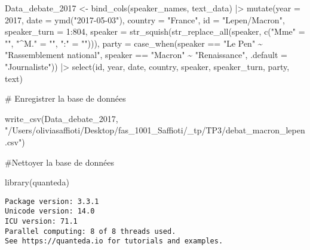 \documentclass[
  letterpaper,
  DIV=11,
  numbers=noendperiod]{scrartcl}
\newenvironment{Shaded}{\begin{snugshade}}{\end{snugshade}}
\newcommand{\AttributeTok}[1]{\textcolor[rgb]{0.40,0.45,0.13}{#1}}
\newcommand{\CommentTok}[1]{\textcolor[rgb]{0.37,0.37,0.37}{#1}}
\newcommand{\DecValTok}[1]{\textcolor[rgb]{0.68,0.00,0.00}{#1}}
\newcommand{\FunctionTok}[1]{\textcolor[rgb]{0.28,0.35,0.67}{#1}}
\newcommand{\NormalTok}[1]{\textcolor[rgb]{0.00,0.23,0.31}{#1}}
\newcommand{\OtherTok}[1]{\textcolor[rgb]{0.00,0.23,0.31}{#1}}
\newcommand{\SpecialCharTok}[1]{\textcolor[rgb]{0.37,0.37,0.37}{#1}}
\newcommand{\StringTok}[1]{\textcolor[rgb]{0.13,0.47,0.30}{#1}}
\begin{document}
\begin{Shaded}
\begin{Highlighting}[]
\NormalTok{Data\_debate\_2017 }\OtherTok{\textless{}{-}} \FunctionTok{bind\_cols}\NormalTok{(speaker\_names, text\_data) }\SpecialCharTok{|\textgreater{}} 
  \FunctionTok{mutate}\NormalTok{(}\AttributeTok{year         =} \DecValTok{2017}\NormalTok{, }
         \AttributeTok{date         =} \FunctionTok{ymd}\NormalTok{(}\StringTok{"2017{-}05{-}03"}\NormalTok{), }
         \AttributeTok{country      =} \StringTok{"France"}\NormalTok{, }
         \AttributeTok{id           =} \StringTok{"Lepen/Macron"}\NormalTok{,}
         \AttributeTok{speaker\_turn =} \DecValTok{1}\SpecialCharTok{:}\DecValTok{804}\NormalTok{,}
         \AttributeTok{speaker =} \FunctionTok{str\_squish}\NormalTok{(}\FunctionTok{str\_replace\_all}\NormalTok{(speaker, }\FunctionTok{c}\NormalTok{(}\StringTok{"Mme"} \OtherTok{=} \StringTok{""}\NormalTok{,}
                                                         \StringTok{"\^{}M."} \OtherTok{=} \StringTok{""}\NormalTok{,}
                                                         \StringTok{":"}   \OtherTok{=} \StringTok{""}\NormalTok{))),}
         \AttributeTok{party =} \FunctionTok{case\_when}\NormalTok{(speaker }\SpecialCharTok{==} \StringTok{"Le Pen"} \SpecialCharTok{\textasciitilde{}} \StringTok{"Rassemblement national"}\NormalTok{,}
\NormalTok{                           speaker }\SpecialCharTok{==} \StringTok{"Macron"} \SpecialCharTok{\textasciitilde{}} \StringTok{"Renaissance"}\NormalTok{,}
                           \AttributeTok{.default =} \StringTok{"Journaliste"}\NormalTok{)) }\SpecialCharTok{|\textgreater{}} 
  \FunctionTok{select}\NormalTok{(id, year, date, country, speaker, speaker\_turn, party, text)}



\CommentTok{\# Enregistrer la base de données}

\FunctionTok{write\_csv}\NormalTok{(Data\_debate\_2017, }\StringTok{"/Users/oliviasaffioti/Desktop/fas\_1001\_Saffioti/\_tp/TP3/debat\_macron\_lepen.csv"}\NormalTok{)}


\CommentTok{\#Nettoyer la base de données}

\FunctionTok{library}\NormalTok{(quanteda)}
\end{Highlighting}
\end{Shaded}

\begin{verbatim}
Package version: 3.3.1
Unicode version: 14.0
ICU version: 71.1
Parallel computing: 8 of 8 threads used.
See https://quanteda.io for tutorials and examples.
\end{verbatim}
\end{document}
